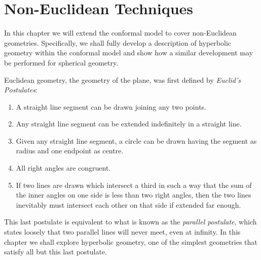 \begin{savequote}
\end{savequote}

\chapter{Non-Euclidean Techniques}
\label{chap:noneuclid}

In this chapter we will extend the conformal model to cover non-Euclidean
geometries. Specifically, we shall fully develop a description of hyperbolic
geometry within the conformal model and show how a similar development may be
performed for spherical geometry.

Euclidean geometry, the geometry of the plane, was first defined\cite{Heath56} by
\emph{Euclid's Postulates}:

\begin{enumerate}
\item A straight line segment can be drawn joining any two points. 
\item Any straight line segment can be extended indefinitely in a straight line. 
\item Given any straight line segment, a circle can be drawn having the segment as radius and one endpoint as centre. 
\item All right angles are congruent. 
\item If two lines are drawn which intersect a third in such a way that the sum of the inner angles on one side is less than two right angles, then the two lines inevitably must intersect each other on that side if extended far enough.
\end{enumerate} 

This last postulate is equivalent to what is known as the \emph{parallel postulate},
which states loosely that two parallel lines will never meet, even at infinity.
In this chapter we shall explore hyperbolic geometry, one of the simplest
geometries that satisfy all but this last postulate.



